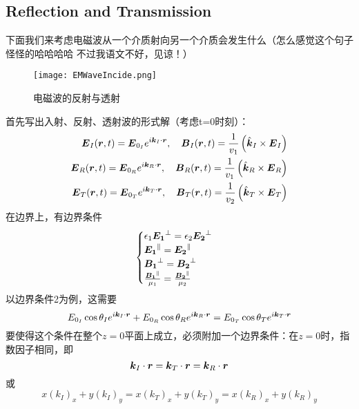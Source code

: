 \documentclass[14pt,oneside]{book}
\begin{document}
\begin{large}
\section{Reflection and Transmission}
下面我们来考虑电磁波从一个介质射向另一个介质会发生什么（怎么感觉这个句子怪怪的哈哈哈哈 不过我语文不好，见谅！）
\begin{figure}[H]
\centering
  \texttt{[image: EMWaveIncide.png]}
  \caption{电磁波的反射与透射}
\end{figure}
首先写出入射、反射、透射波的形式解（考虑t=0时刻）：
\begin{equation}
\begin{aligned}
	{\vb*{E}}_I(\vb*{r}, t)={\vb*{E}}_{0_I} e^{i\vb*{k}_I \cdot \vb*{r}}, \quad {\vb*{B}}_I(\vb*{r}, t)=\frac{1}{v_1}\left(\hat{\vb*{k}}_I \times {\vb*{E}}_I\right)\\
	{\vb*{E}}_R(\vb*{r}, t)={\vb*{E}}_{0_R} e^{i\vb*{k}_R \cdot \vb*{r}}, \quad {\vb*{B}}_R(\vb*{r}, t)=\frac{1}{v_1}\left(\hat{\vb*{k}}_R \times {\vb*{E}}_R\right)\\
{\vb*{E}}_T(\vb*{r}, t)={\vb*{E}}_{0_T} e^{i\vb*{k}_T \cdot \vb*{r}}, \quad {\vb*{B}}_T(\vb*{r}, t)=\frac{1}{v_2}\left(\hat{\vb*{k}}_T \times {\vb*{E}}_T\right)
\end{aligned}
\end{equation}
在边界上，有边界条件
\begin{align}
	\begin{cases}
		\epsilon_1\vb*{E_1}^\perp=\epsilon_2\vb*{E_2}^\perp\\
		\vb*{E_1}^\parallel=\vb*{E_2}^\parallel\\
		\vb*{B_1}^\perp=\vb*{B_2}^\perp\\
		\frac{\vb*{B_1}^\parallel}{\mu_1}=\frac{\vb*{B_2}^\parallel}{\mu_2}
	\end{cases}
\end{align}
以边界条件2为例，这需要
\begin{equation}
  E_{0_I}\cos\theta_I e^{i\vb*{k}_I \cdot \vb*{r}}+E_{0_R}\cos\theta_R e^{i\vb*{k}_R \cdot \vb*{r}}=E_{0_T}\cos\theta_T e^{i\vb*{k}_T \cdot \vb*{r}}
\end{equation}
要使得这个条件在整个$z=0$平面上成立，必须附加一个边界条件：在$z=0$时，指数因子相同，即
\begin{equation}
  \vb*{k}_I \cdot \vb*{r}=\vb*{k}_T \cdot \vb*{r}=\vb*{k}_R \cdot \vb*{r}
\end{equation}
或
\begin{equation}
  x(k_I)_x+y(k_I)_y=x(k_T)_x+y(k_T)_y=x(k_R)_x+y(k_R)_y
\end{equation}

\end{large}
\end{document}

